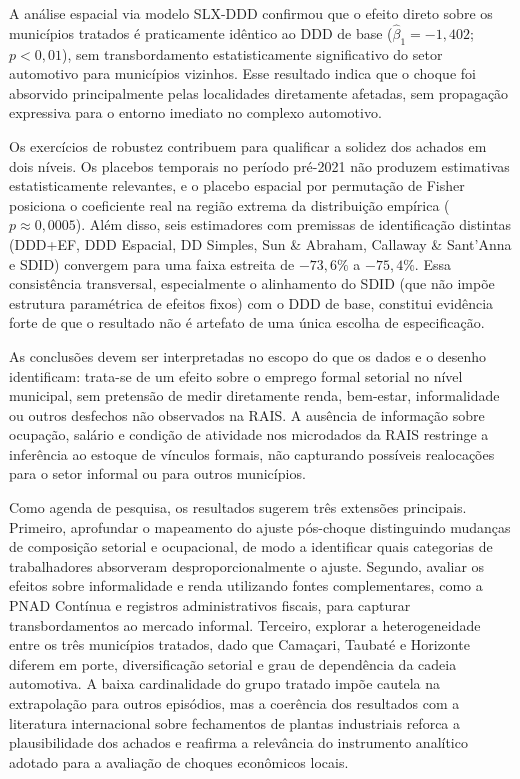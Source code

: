 \documentclass[12pt,a4paper]{article}
\begin{document}
A an\'alise espacial via modelo SLX-DDD confirmou que o efeito direto sobre os munic\'ipios tratados \'e praticamente id\^entico ao DDD de base ($\hat{\beta}_1 = -1{,}402$; $p < 0{,}01$), sem transbordamento estatisticamente significativo do setor automotivo para munic\'ipios vizinhos. Esse resultado indica que o choque foi absorvido principalmente pelas localidades diretamente afetadas, sem propaga\c{c}\~ao expressiva para o entorno imediato no complexo automotivo.

Os exerc\'icios de robustez contribuem para qualificar a solidez dos achados em dois n\'iveis. Os placebos temporais no per\'iodo pr\'e-2021 n\~ao produzem estimativas estatisticamente relevantes, e o placebo espacial por permuta\c{c}\~ao de Fisher posiciona o coeficiente real na regi\~ao extrema da distribui\c{c}\~ao emp\'irica ($p \approx 0{,}0005$). Al\'em disso, seis estimadores com premissas de identifica\c{c}\~ao distintas (DDD+EF, DDD Espacial, DD Simples, Sun \& Abraham, Callaway \& Sant'Anna e SDID) convergem para uma faixa estreita de $-73{,}6\%$ a $-75{,}4\%$. Essa consist\^encia transversal, especialmente o alinhamento do SDID (que n\~ao imp\~oe estrutura param\'etrica de efeitos fixos) com o DDD de base, constitui evid\^encia forte de que o resultado n\~ao \'e artefato de uma \'unica escolha de especifica\c{c}\~ao.

As conclus\~oes devem ser interpretadas no escopo do que os dados e o desenho identificam: trata-se de um efeito sobre o emprego formal setorial no n\'ivel municipal, sem pretens\~ao de medir diretamente renda, bem-estar, informalidade ou outros desfechos n\~ao observados na RAIS. A aus\^encia de informa\c{c}\~ao sobre ocupa\c{c}\~ao, sal\'ario e condi\c{c}\~ao de atividade nos microdados da RAIS restringe a infer\^encia ao estoque de v\'inculos formais, n\~ao capturando poss\'iveis realoca\c{c}\~oes para o setor informal ou para outros munic\'ipios.

Como agenda de pesquisa, os resultados sugerem tr\^es extens\~oes principais. Primeiro, aprofundar o mapeamento do ajuste p\'os-choque distinguindo mudan\c{c}as de composi\c{c}\~ao setorial e ocupacional, de modo a identificar quais categorias de trabalhadores absorveram desproporcionalmente o ajuste. Segundo, avaliar os efeitos sobre informalidade e renda utilizando fontes complementares, como a PNAD Cont\'inua e registros administrativos fiscais, para capturar transbordamentos ao mercado informal. Terceiro, explorar a heterogeneidade entre os tr\^es munic\'ipios tratados, dado que Cama\c{c}ari, Taubat\'e e Horizonte diferem em porte, diversifica\c{c}\~ao setorial e grau de depend\^encia da cadeia automotiva. A baixa cardinalidade do grupo tratado imp\~oe cautela na extrapola\c{c}\~ao para outros epis\'odios, mas a coer\^encia dos resultados com a literatura internacional sobre fechamentos de plantas industriais \parencite{jofremonseny2018,beer2019,chapain2008} reforca a plausibilidade dos achados e reafirma a relev\^ancia do instrumento anal\'itico adotado para a avalia\c{c}\~ao de choques econ\^omicos locais.

\printbibliography
\end{document}
